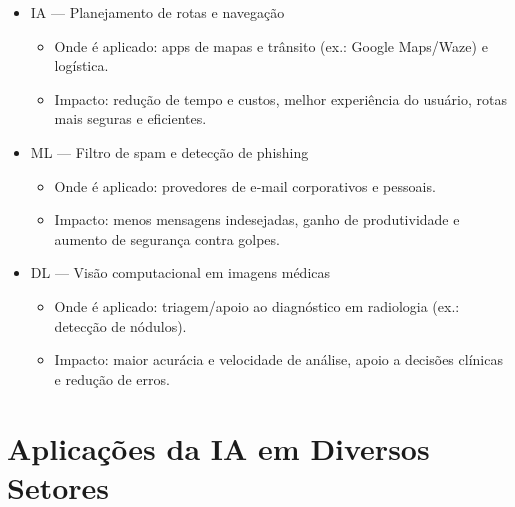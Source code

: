 \documentclass[a4paper,12pt]{article}
\begin{document}
\begin{itemize}
\item IA — Planejamento de rotas e navegação
  \begin{itemize}
  \item Onde é aplicado: apps de mapas e trânsito (ex.: Google Maps/Waze) e logística.
  \item Impacto: redução de tempo e custos, melhor experiência do usuário, rotas mais seguras e eficientes.
  \end{itemize}

\item ML — Filtro de spam e detecção de phishing
  \begin{itemize}
  \item Onde é aplicado: provedores de e‑mail corporativos e pessoais.
  \item Impacto: menos mensagens indesejadas, ganho de produtividade e aumento de segurança contra golpes.
  \end{itemize}

\item DL — Visão computacional em imagens médicas
  \begin{itemize}
  \item Onde é aplicado: triagem/apoio ao diagnóstico em radiologia (ex.: detecção de nódulos).
  \item Impacto: maior acurácia e velocidade de análise, apoio a decisões clínicas e redução de erros.
  \end{itemize}
\end{itemize}

\section{Aplicações da IA em Diversos Setores}
\end{document}
